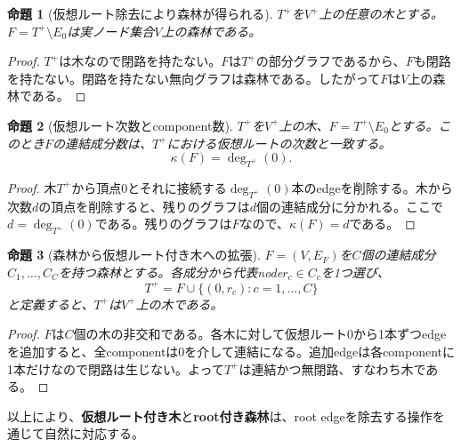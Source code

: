 \documentclass[11pt,a4paper]{article}
\newtheorem{proposition}{命題}
\begin{document}
\begin{proposition}[仮想ルート除去により森林が得られる]
$T^+$を$V^+$上の任意の木とする。$F=T^+\setminus E_0$は実ノード集合$V$上の森林である。
\end{proposition}

\begin{proof}
$T^+$は木なので閉路を持たない。$F$は$T^+$の部分グラフであるから、$F$も閉路を持たない。閉路を持たない無向グラフは森林である。したがって$F$は$V$上の森林である。
\end{proof}

\begin{proposition}[仮想ルート次数とcomponent数]
$T^+$を$V^+$上の木、$F=T^+\setminus E_0$とする。このとき$F$の連結成分数は、$T^+$における仮想ルートの次数と一致する。
\begin{equation}
  \kappa(F)=\deg_{T^+}(0).
  \label{eq:root_degree_component}
\end{equation}
\end{proposition}

\begin{proof}
木$T^+$から頂点$0$とそれに接続する$\deg_{T^+}(0)$本のedgeを削除する。木から次数$d$の頂点を削除すると、残りのグラフは$d$個の連結成分に分かれる。ここで$d=\deg_{T^+}(0)$である。残りのグラフは$F$なので、$\kappa(F)=d$である。
\end{proof}

\begin{proposition}[森林から仮想ルート付き木への拡張]
$F=(V,E_F)$を$C$個の連結成分$C_1,\ldots,C_C$を持つ森林とする。各成分から代表node$r_c\in C_c$を1つ選び、
\begin{equation}
  T^+ = F\cup \{(0,r_c):c=1,\ldots,C\}
\end{equation}
と定義すると、$T^+$は$V^+$上の木である。
\end{proposition}

\begin{proof}
$F$は$C$個の木の非交和である。各木に対して仮想ルート$0$から1本ずつedgeを追加すると、全componentは$0$を介して連結になる。追加edgeは各componentに1本だけなので閉路は生じない。よって$T^+$は連結かつ無閉路、すなわち木である。
\end{proof}

以上により、\textbf{仮想ルート付き木}と\textbf{root付き森林}は、root edgeを除去する操作を通じて自然に対応する。
\end{document}
